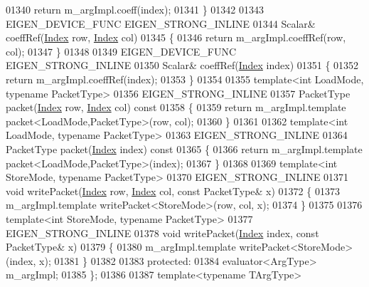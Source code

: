 \begin{DoxyCode}
01340     \textcolor{keywordflow}{return} m\_argImpl.coeff(index);
01341   \}
01342 
01343   EIGEN\_DEVICE\_FUNC EIGEN\_STRONG\_INLINE
01344   Scalar& coeffRef(\hyperlink{namespace_eigen_a62e77e0933482dafde8fe197d9a2cfde}{Index} row, \hyperlink{namespace_eigen_a62e77e0933482dafde8fe197d9a2cfde}{Index} col)
01345   \{
01346     \textcolor{keywordflow}{return} m\_argImpl.coeffRef(row, col);
01347   \}
01348 
01349   EIGEN\_DEVICE\_FUNC EIGEN\_STRONG\_INLINE
01350   Scalar& coeffRef(\hyperlink{namespace_eigen_a62e77e0933482dafde8fe197d9a2cfde}{Index} index)
01351   \{
01352     \textcolor{keywordflow}{return} m\_argImpl.coeffRef(index);
01353   \}
01354 
01355   \textcolor{keyword}{template}<\textcolor{keywordtype}{int} LoadMode, \textcolor{keyword}{typename} PacketType>
01356   EIGEN\_STRONG\_INLINE
01357   PacketType packet(\hyperlink{namespace_eigen_a62e77e0933482dafde8fe197d9a2cfde}{Index} row, \hyperlink{namespace_eigen_a62e77e0933482dafde8fe197d9a2cfde}{Index} col)\textcolor{keyword}{ const}
01358 \textcolor{keyword}{  }\{
01359     \textcolor{keywordflow}{return} m\_argImpl.template packet<LoadMode,PacketType>(row, col);
01360   \}
01361 
01362   \textcolor{keyword}{template}<\textcolor{keywordtype}{int} LoadMode, \textcolor{keyword}{typename} PacketType>
01363   EIGEN\_STRONG\_INLINE
01364   PacketType packet(\hyperlink{namespace_eigen_a62e77e0933482dafde8fe197d9a2cfde}{Index} index)\textcolor{keyword}{ const}
01365 \textcolor{keyword}{  }\{
01366     \textcolor{keywordflow}{return} m\_argImpl.template packet<LoadMode,PacketType>(index);
01367   \}
01368 
01369   \textcolor{keyword}{template}<\textcolor{keywordtype}{int} StoreMode, \textcolor{keyword}{typename} PacketType>
01370   EIGEN\_STRONG\_INLINE
01371   \textcolor{keywordtype}{void} writePacket(\hyperlink{namespace_eigen_a62e77e0933482dafde8fe197d9a2cfde}{Index} row, \hyperlink{namespace_eigen_a62e77e0933482dafde8fe197d9a2cfde}{Index} col, \textcolor{keyword}{const} PacketType& x)
01372   \{
01373     m\_argImpl.template writePacket<StoreMode>(row, col, x);
01374   \}
01375 
01376   \textcolor{keyword}{template}<\textcolor{keywordtype}{int} StoreMode, \textcolor{keyword}{typename} PacketType>
01377   EIGEN\_STRONG\_INLINE
01378   \textcolor{keywordtype}{void} writePacket(\hyperlink{namespace_eigen_a62e77e0933482dafde8fe197d9a2cfde}{Index} index, \textcolor{keyword}{const} PacketType& x)
01379   \{
01380     m\_argImpl.template writePacket<StoreMode>(index, x);
01381   \}
01382 
01383 \textcolor{keyword}{protected}:
01384   evaluator<ArgType> m\_argImpl;
01385 \};
01386 
01387 \textcolor{keyword}{template}<\textcolor{keyword}{typename} TArgType>

\end{DoxyCode}
